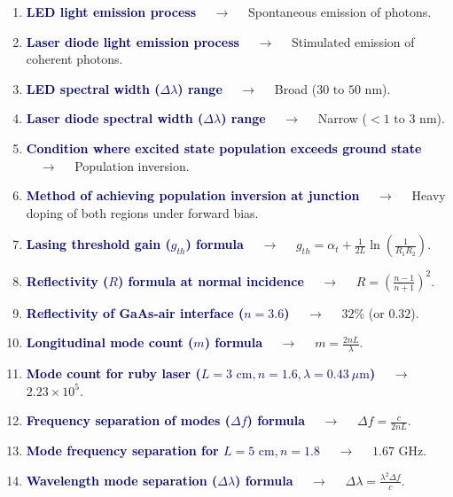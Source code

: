 \documentclass[11pt,a4paper]{article}
\begin{document}
\begin{enumerate}[label=\arabic*., leftmargin=*, labelsep=0.8em, itemsep=0.35em, parsep=0.1em, topsep=0.2em]
  \item \textcolor{darkblue}{\textbf{LED light emission process}} $\quad\to\quad$ Spontaneous emission of photons.
  \item \textcolor{darkblue}{\textbf{Laser diode light emission process}} $\quad\to\quad$ Stimulated emission of coherent photons.
  \item \textcolor{darkblue}{\textbf{LED spectral width ($\Delta\lambda$) range}} $\quad\to\quad$ Broad ($30 \text{ to } 50\text{ nm}$).
  \item \textcolor{darkblue}{\textbf{Laser diode spectral width ($\Delta\lambda$) range}} $\quad\to\quad$ Narrow ($< 1 \text{ to } 3\text{ nm}$).
  \item \textcolor{darkblue}{\textbf{Condition where excited state population exceeds ground state}} $\quad\to\quad$ Population inversion.
  \item \textcolor{darkblue}{\textbf{Method of achieving population inversion at junction}} $\quad\to\quad$ Heavy doping of both regions under forward bias.
  \item \textcolor{darkblue}{\textbf{Lasing threshold gain ($g_{th}$) formula}} $\quad\to\quad$ $g_{th} = \alpha_t + \frac{1}{2L} \ln\left(\frac{1}{R_1 R_2}\right)$.
  \item \textcolor{darkblue}{\textbf{Reflectivity ($R$) formula at normal incidence}} $\quad\to\quad$ $R = \left(\frac{n-1}{n+1}\right)^2$.
  \item \textcolor{darkblue}{\textbf{Reflectivity of GaAs-air interface ($n=3.6$)}} $\quad\to\quad$ $32\%$ (or $0.32$).
  \item \textcolor{darkblue}{\textbf{Longitudinal mode count ($m$) formula}} $\quad\to\quad$ $m = \frac{2nL}{\lambda}$.
  \item \textcolor{darkblue}{\textbf{Mode count for ruby laser ($L=3\text{ cm}, n=1.6, \lambda=0.43\ \mu\text{m}$)}} $\quad\to\quad$ $2.23 \times 10^5$.
  \item \textcolor{darkblue}{\textbf{Frequency separation of modes ($\Delta f$) formula}} $\quad\to\quad$ $\Delta f = \frac{c}{2nL}$.
  \item \textcolor{darkblue}{\textbf{Mode frequency separation for $L=5\text{ cm}, n=1.8$}} $\quad\to\quad$ $1.67\text{ GHz}$.
  \item \textcolor{darkblue}{\textbf{Wavelength mode separation ($\Delta\lambda$) formula}} $\quad\to\quad$ $\Delta \lambda = \frac{\lambda^2 \Delta f}{c}$.

\end{enumerate}
\end{document}
